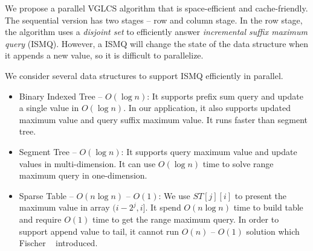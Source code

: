 We propose a parallel VGLCS algorithm that is space-efficient and
cache-friendly.  The sequential version has two stages -- row and
column stage.  In the row stage, the algorithm uses a {\em disjoint
  set} to efficiently answer {\em incremental suffix maximum query}
(ISMQ).  However, a ISMQ will change the state of the data structure
when it appends a new value, so it is difficult to parallelize.  



\iffalse 這裡我們傾向空間複雜度常數小且針對快取友善設計算法。平行算法主
要分成兩個階段－縱向和橫向階段，縱向階段為數個列的後綴極值查找，橫向階
段在行上運行 $n$ 個元素和 $n$ 組詢問。在橫向階段，我們需要解決增長後綴
最大值查找 (\emph{incremental suffix maximum query}, ISMQ)易於實作的并
查集支持單一操作 $O(\alpha(n))$。然而，在過程中每插入一個元素便改動數據
結構以支持下一個後綴詢問，這部分使得查詢難以平行化。為消除資料相依性，
我們找到幾種區間詢問的替代方案。如：\fi

We consider several data structures to support ISMQ efficiently in
parallel.

\begin{itemize}
  \item Binary Indexed Tree\cite{Fenwick1994AND} -- $O(\log n)$: It
    supports prefix sum query and update a single value in $O(\log
    n)$.  In our application, it also supports updated maximum value
    and query suffix maximum value.  It runs faster than segment tree.
  \item Segment Tree\cite{berg2000computational} -- $O(\log n)$: It
    supports query maximum value and update values in multi-dimension.
    It can use $O(\log n)$ time to solve range maximum query in
    one-dimension.
  \item Sparse Table\cite{Berkman1993RecursiveSP} -- $O(n \log n)$ --
    $O(1)$: We use $ST[j][i]$ to present the maximum value in array
    $(i-2^j,i]$.  It spend $O(n \log n)$ time to build table and
    require $O(1)$ time to get the range maximum query. In order to
    support append value to tail, it cannot run $O(n)$ -- $O(1)$
    solution which Fischer ~\cite{Fischer2006TheoreticalAP}
    introduced.
\end{itemize}

\iffalse
\begin{itemize}
\item 樹狀數組 (Binary Indexed Tree) -- $O(\log n)$: 對於任意前綴查找極
  值和更新元素，單一操作的時間複雜度為 $O(\log n)$，其運行常數比線段樹
  低。
  \item 線段樹 (Segment Tree) -- $O(\log n)$: 支持更高維度的正交區塊搜
    索，而我們用在區間極值查找需要 $O(\log n)$ 的時間完成所有區間查詢操
    作。
  \item 稀疏表 (Sparse Table) -- $O(n)$ -- $O(1)$:建立表格 $ST[j][i]$
    表示區間 $(i-2^j,i]$ 之間的極值。建表時間複雜度需 $O(n)$，對於任意
      區間詢問可以拆分 2 個 super-block 檢索和 2 個 in-block 檢索，如圖
      \ref{fig:interval-decomposition} 的說明，轉換過程和存取時間皆需要
      $O(1)$。
\end{itemize}
\fi

